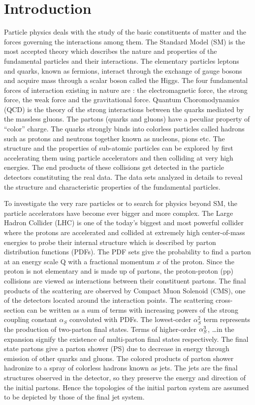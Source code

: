 \chapter{Introduction}
\label{chap:Introduction}

Particle physics deals with the study of the basic constituents of matter and the forces governing the interactions among them. The Standard Model (SM) is the most accepted theory which describes the nature and properties of the fundamental particles and their interactions. The elementary particles leptons and quarks, known as fermions, interact through the exchange of gauge bosons and acquire mass through a scalar boson called the Higgs. The four fundamental forces of interaction existing in nature are : the electromagnetic force, the strong force, the weak force and the gravitational force. Quantum Choromodynamics (QCD) is the theory of the strong interactions between the quarks mediated by the massless gluons. The partons (quarks and gluons) have a peculiar property of ``color'' charge. The quarks strongly binds into colorless particles called hadrons such as protons and neutrons together known as nucleons, pions etc. The structure and the properties of sub-atomic particles can be explored by first accelerating them using particle accelerators and then colliding at very high energies. The end products of these collisions get detected in the particle detectors constituting the real data. The data sets analyzed in details to reveal the structure and characteristic properties of the fundamental particles.

To investigate the very rare particles or to search for physics beyond SM, the particle accelerators have become ever bigger and more complex. The Large Hadron Collider (LHC) is one of the today's biggest and most powerful collider where the protons are accelerated and collided at extremely high center-of-mass energies to probe their internal structure which is described by parton distribution functions (PDFs). The PDF sets give the probability to find a parton at an energy scale Q with a fractional momentum $x$ of the proton. Since the proton is not elementary and is made up of partons, the proton-proton (pp) collisions are viewed as interactions between their constituent partons. The final products of the scattering are observed by Compact Muon Solenoid (CMS), one of the detectors located around the interaction points. The scattering cross-section can be written as a sum of terms with increasing powers of the strong coupling constant $\alpha_{S}$ convoluted with PDFs. The lowest-order $\alpha_{S}^{2}$ term represents the production of two-parton final states. Terms of higher-order $\alpha_S^3$, \ldots in the expansion signify the existence of multi-parton final states respectively. The final state partons give a parton shower (PS) due to decrease in energy through emission of other quarks and gluons. The colored products of parton shower hadronize to a spray of colorless hadrons known as jets. The jets are the final structures observed in the detector, so they preserve the energy and direction of the initial partons. Hence the topologies of the initial parton system are assumed to be depicted by those of the final jet system.

